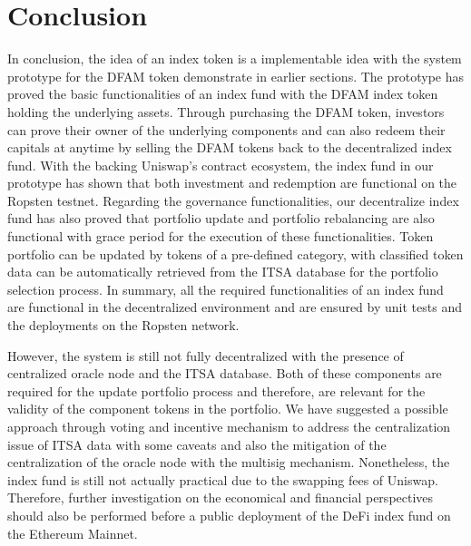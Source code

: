 \chapter{Conclusion}\label{chapter:conclusion}

In conclusion, the idea of an index token is a implementable idea with the system prototype for the DFAM token demonstrate in earlier sections. The prototype has proved the basic functionalities of an index fund with the DFAM index token holding the underlying assets. Through purchasing the DFAM token, investors can prove their owner of the underlying components and can also redeem their capitals at anytime by selling the DFAM tokens back to the decentralized index fund. With the backing Uniswap's contract ecosystem, the index fund in our prototype has shown that both investment and redemption are functional on the Ropsten testnet. Regarding the governance functionalities, our decentralize index fund has also proved that portfolio update and portfolio rebalancing are also functional with grace period for the execution of these functionalities. Token portfolio can be updated by tokens of a pre-defined category, with classified token data can be automatically retrieved from the ITSA database for the portfolio selection process. In summary, all the required functionalities of an index fund are functional in the decentralized environment and are ensured by unit tests and the deployments on the Ropsten network.

However, the system is still not fully decentralized with the presence of centralized oracle node and the ITSA database. Both of these components are required for the update portfolio process and therefore, are relevant for the validity of the component tokens in the portfolio. We have suggested a possible approach through voting and incentive mechanism to address the centralization issue of ITSA data with some caveats and also the mitigation of the centralization of the oracle node with the multisig mechanism. Nonetheless, the index fund is still not actually practical due to the swapping fees of Uniswap. Therefore, further investigation on the economical and financial perspectives should also be performed before a public deployment of the DeFi index fund on the Ethereum Mainnet.